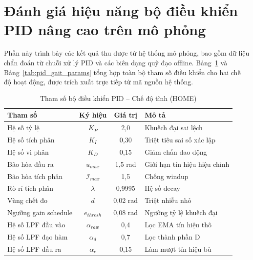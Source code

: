 \section{Đánh giá hiệu năng bộ điều khiển PID nâng cao trên mô phỏng}

Phần này trình bày các kết quả thu được từ hệ thống mô phỏng, bao gồm dữ liệu chẩn đoán từ chuỗi xử lý PID và các biên dạng quỹ đạo offline. Bảng~\ref{tab:pid_home_params} và Bảng~\ref{tab:pid_gait_params} tổng hợp toàn bộ tham số điều khiển cho hai chế độ hoạt động, được trích xuất trực tiếp từ mã nguồn hệ thống.

\begin{table}[H]
\centering
\caption{Tham số bộ điều khiển PID -- Chế độ tĩnh (HOME)}
\label{tab:pid_home_params}
\renewcommand{\arraystretch}{1.3}
\begin{tabular}{|l|c|c|l|}
\hline
\textbf{Tham số} & \textbf{Ký hiệu} & \textbf{Giá trị} & \textbf{Mô tả} \\ \hline
Hệ số tỷ lệ & $K_P$ & 2,0 & Khuếch đại sai lệch \\ \hline
Hệ số tích phân & $K_I$ & 0,30 & Triệt tiêu sai số xác lập \\ \hline
Hệ số vi phân & $K_D$ & 0,15 & Giảm chấn dao động \\ \hline
Bão hòa đầu ra & $u_{max}$ & 1,5 rad & Giới hạn tín hiệu hiệu chỉnh \\ \hline
Bão hòa tích phân & $\mathcal{I}_{max}$ & 1,5 & Chống windup \\ \hline
Rò rỉ tích phân & $\lambda$ & 0,9995 & Hệ số decay \\ \hline
Vùng chết đo & $d$ & 0,02 rad & Triệt nhiễu nhỏ \\ \hline
Ngưỡng gain schedule & $e_{thresh}$ & 0,08 rad & Ngưỡng tỷ lệ khuếch đại \\ \hline
Hệ số LPF đầu vào & $\alpha_{raw}$ & 0,4 & Lọc EMA tín hiệu thô \\ \hline
Hệ số LPF đạo hàm & $\alpha_d$ & 0,7 & Lọc thành phần D \\ \hline
Hệ số LPF đầu ra & $\alpha_c$ & 0,15 & Làm mượt tín hiệu bù \\ \hline
\end{tabular}
\end{table}

